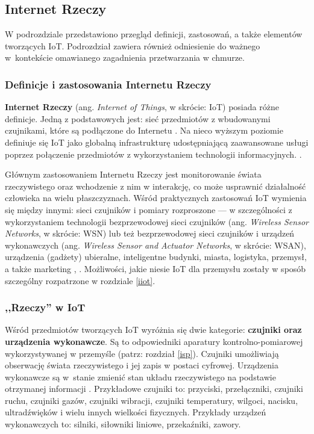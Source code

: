 \documentclass[a4paper, 12pt, twoside]{article}
\begin{document}
\subsection{Internet Rzeczy}\label{iot}

W podrozdziale przedstawiono przegląd definicji, zastosowań, a także
elementów tworzących IoT. Podrozdział zawiera również odniesienie do ważnego
w~kontekście omawianego zagadnienia przetwarzania w chmurze.

\subsubsection{Definicje i zastosowania Internetu Rzeczy}

\textbf{Internet Rzeczy} (ang. \emph{Internet of Things}, w skrócie: IoT) posiada różne definicje.
Jedną z podstawowych jest: sieć przedmiotów z wbudowanymi czujnikami, które są podłączone
do Internetu \cite{intro-to-iot}. Na nieco wyższym poziomie definiuje się IoT jako globalną infrastrukturę udostępniającą
zaawansowane usługi poprzez połączenie przedmiotów z wykorzystaniem technologii informacyjnych.
\cite{intro-to-iot}.

Głównym zastosowaniem Internetu Rzeczy jest monitorowanie świata rzeczywistego
oraz wchodzenie z nim w interakcję, co może usprawnić działalność człowieka na wielu płaszczyznach.
Wśród praktycznych zastosowań IoT wymienia się między innymi:
sieci czujników i pomiary rozproszone --- w szczególności z wykorzystaniem
technologii bezprzewodowej sieci czujników
(ang. \emph{Wireless Sensor Networks}, w skrócie: WSN) lub też
bezprzewodowej sieci czujników i urządzeń wykonawczych
(ang. \emph{Wireless Sensor and Actuator Networks}, w skrócie: WSAN), urządzenia (gadżety) ubieralne,
inteligentne budynki, miasta, logistyka, przemysł, a także marketing \cite{internet-reczy},
\cite{wsan}.
Możliwości, jakie niesie IoT dla przemysłu zostały w sposób szczególny rozpatrzone
w rozdziale \ref{iiot}.

\subsubsection{,,Rzeczy'' w IoT}

Wśród przedmiotów tworzących IoT wyróżnia się dwie kategorie:
\textbf{czujniki oraz urządzenia wykonawcze}. Są to odpowiedniki aparatury kontrolno-pomiarowej
wykorzystywanej w przemyśle (patrz: rozdział \ref{isp}). Czujniki umożliwiają
obserwację świata rzeczywistego i jej zapis w postaci cyfrowej.
Urządzenia wykonawcze są w~stanie zmienić stan układu rzeczywistego
na podstawie otrzymanej informacji \cite{iot-hype-to-reality}.
Przykładowe czujniki to: przyciski, przełączniki, czujniki ruchu, czujniki gazów,
czujniki wibracji, czujniki temperatury, wilgoci,
nacisku, ultradźwięków i wielu innych wielkości fizycznych. Przykłady urządzeń
wykonawczych to: silniki, siłowniki liniowe, przekaźniki, zawory.
\end{document}

